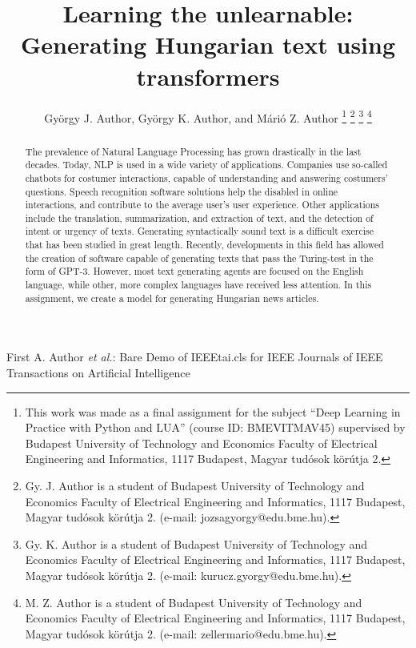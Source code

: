 \documentclass[journal]{IEEEtai}
\begin{document}
\title{ Learning the unlearnable: Generating Hungarian text using transformers } 


\author{György J. Author, György K. Author, and Márió Z. Author
\thanks{This work was made as a final assignment for the subject ``Deep Learning in Practice with Python and LUA'' (course ID: BMEVITMAV45) supervised by Budapest University of Technology and Economics Faculty of Electrical Engineering and Informatics, 1117 Budapest, Magyar tudósok körútja 2. }
\thanks{Gy. J. Author is a student of Budapest University of Technology and Economics Faculty of Electrical Engineering and Informatics, 1117 Budapest, Magyar tudósok körútja 2. (e-mail: jozsagyorgy@edu.bme.hu).}
\thanks{Gy. K. Author is a student of Budapest University of Technology and Economics Faculty of Electrical Engineering and Informatics, 1117 Budapest, Magyar tudósok körútja 2. (e-mail: kurucz.gyorgy@edu.bme.hu).}
\thanks{M. Z. Author is a student of Budapest University of Technology and Economics Faculty of Electrical Engineering and Informatics, 1117 Budapest, Magyar tudósok körútja 2. (e-mail: zellermario@edu.bme.hu).}}

{First A. Author \MakeLowercase{\textit{et al.}}: Bare Demo of IEEEtai.cls for IEEE Journals of IEEE Transactions on Artificial Intelligence}

\maketitle

\begin{abstract}
The prevalence of Natural Language Processing has grown drastically in the last decades. Today, NLP is used in a wide variety of applications. Companies use so-called chatbots for costumer interactions, capable of understanding and answering costumers' questions. Speech recognition software solutions help the disabled in online interactions, and contribute to the average user's user experience. Other applications include the translation, summarization, and extraction of text, and the detection of intent or urgency of texts. Generating syntactically sound text is a difficult exercise that has been studied in great length. Recently, developments in this field has allowed the creation of software capable of generating texts that pass the Turing-test in the form of GPT-3. However, most text generating agents are focused on the English language, while other, more complex languages have received less attention. In this assignment, we create a model for generating Hungarian news articles.
\end{abstract}
\end{document}
